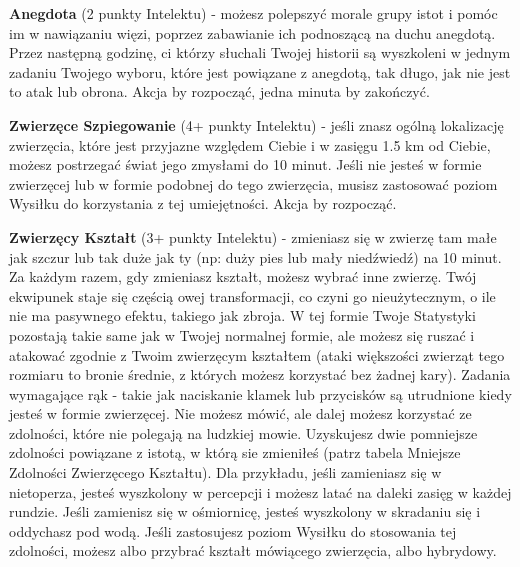 \textbf{Anegdota}\label{sec:Anegdota} (2 punkty Intelektu) - możesz polepszyć morale grupy istot i pomóc im w nawiązaniu więzi, poprzez zabawianie ich podnoszącą na duchu anegdotą. Przez następną godzinę, ci którzy słuchali Twojej historii są wyszkoleni w jednym zadaniu Twojego wyboru, które jest powiązane z anegdotą, tak długo, jak nie jest to atak lub obrona. Akcja by rozpocząć, jedna minuta by zakończyć.

\textbf{Zwierzęce Szpiegowanie}\label{sec:Zwierzęce Szpiegowanie} (4+ punkty Intelektu) - jeśli znasz ogólną lokalizację zwierzęcia, które jest przyjazne względem Ciebie i w zasięgu 1.5 km od Ciebie, możesz postrzegać świat jego zmysłami do 10 minut. Jeśli nie jesteś w formie zwierzęcej lub w formie podobnej do tego zwierzęcia, musisz zastosować poziom Wysiłku do korzystania z tej umiejętności. Akcja by rozpocząć. 

\textbf{Zwierzęcy Kształt}\label{sec:Zwierzęcy Kształt} (3+ punkty Intelektu) - zmieniasz się w zwierzę tam małe jak szczur lub tak duże jak ty (np: duży pies lub mały niedźwiedź) na 10 minut. Za każdym razem, gdy zmieniasz kształt, możesz wybrać inne zwierzę. Twój ekwipunek staje się częścią owej transformacji, co czyni go nieużytecznym, o ile nie ma pasywnego efektu, takiego jak zbroja. W tej formie Twoje Statystyki pozostają takie same jak w Twojej normalnej formie, ale możesz się ruszać i atakować zgodnie z Twoim zwierzęcym kształtem (ataki większości zwierząt tego rozmiaru to bronie średnie, z których możesz korzystać bez żadnej kary). Zadania wymagające rąk - takie jak naciskanie klamek lub przycisków są utrudnione kiedy jesteś w formie zwierzęcej. Nie możesz mówić, ale dalej możesz korzystać ze zdolności, które nie polegają na ludzkiej mowie. Uzyskujesz dwie pomniejsze zdolności powiązane z istotą, w którą sie zmieniłeś (patrz tabela Mniejsze Zdolności Zwierzęcego Kształtu). Dla przykładu, jeśli zamieniasz się w nietoperza, jesteś wyszkolony w percepcji i możesz latać na daleki zasięg w każdej rundzie. Jeśli zamienisz się w ośmiornicę, jesteś wyszkolony w skradaniu się i oddychasz pod wodą. Jeśli zastosujesz poziom Wysiłku do stosowania tej zdolności, możesz albo przybrać kształt mówiącego zwierzęcia, albo hybrydowy. 